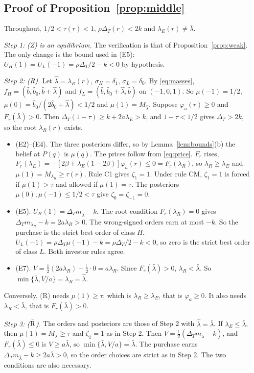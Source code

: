 \documentclass[12pt]{article}
\theoremstyle{definition}
\theoremstyle{remark}
\newcommand{\DT}{\Delta_T}
\newcommand{\lh}{\hat\lambda}
\newcommand{\lb}{\bar\lambda}
\begin{document}
\subsection{Proof of Proposition~\ref{prop:middle}}

Throughout, $1/2<\tau(r)<1$, $\rho\DT(r)<2k$ and $\lambda_E(r)\ne\lb$.

\emph{Step 1: (Z) is an equilibrium.} The verification is that of Proposition~\ref{prop:weak}. The only change is
the bound used in (E5): $U_H(1)=U_L(-1)=\rho\DT/2-k<0$ by hypothesis.

\emph{Step 2: (R).} Let $\lh=\lambda_R(r)$, $\sigma_H=\delta_1$, $\sigma_L=\delta_0$. By \eqref{eq:masses},
$f_H=(\hat b,\hat b_0,\hat b+\lh)$ and $f_L=(\hat b,\hat b_0+\lh,\hat b)$ on $(-1,0,1)$. So
$\mu(-1)=1/2$, $\mu(0)=\hat b_0/(2\hat b_0+\lh)<1/2$ and $\mu(1)=M_{\lh}$. Suppose $\varphi_a(r)\ge0$ and $F_r(\lb)>0$.
Then $\DT(1-\tau)\ge k+2a\lambda_E>k$, and $1-\tau<1/2$ gives $\DT>2k$, so the root $\lambda_R(r)$ exists.
\begin{itemize}[nosep]
\item (E2)--(E4). The three posteriors differ, so by Lemma~\ref{lem:bounds}(b) the belief at $P(q)$ is $\mu(q)$.
  The prices follow from \eqref{eq:price}. $F_r$ rises, $F_r(\lambda_E)=-[2\beta+\lambda_E(1-2\beta)]\varphi_a(r)\le0=F_r(\lambda_R)$, so
  $\lambda_R\ge\lambda_E$ and $\mu(1)=M_{\lambda_R}\ge\tau(r)$. Rule C1 gives $\zeta_1=1$. Under rule CM, $\zeta_1=1$ is
  forced if $\mu(1)>\tau$ and allowed if $\mu(1)=\tau$. The posteriors $\mu(0),\mu(-1)\le1/2<\tau$ give
  $\zeta_0=\zeta_{-1}=0$.
\item (E5). $U_H(1)=\DT m_{\lh}-k$. The root condition $F_r(\lambda_R)=0$ gives $\DT m_{\lambda_R}-k=2a\lambda_R>0$.
  The wrong-signed orders earn at most $-k$. So the purchase is the strict best order of class $H$.
  $U_L(-1)=\rho\DT\mu(-1)-k=\rho\DT/2-k<0$, so zero is the strict best order of class $L$. Both investor rules agree.
\item (E7). $V=\frac12(2a\lambda_R)+\frac12\cdot0=a\lambda_R$. Since $F_r(\lb)>0$, $\lambda_R<\lb$. So
  $\min\{\lb,V/a\}=\lambda_R=\lh$.
\end{itemize}
Conversely, (R) needs $\mu(1)\ge\tau$, which is $\lambda_R\ge\lambda_E$, that is $\varphi_a\ge0$. It also needs
$\lambda_R<\lb$, that is $F_r(\lb)>0$.

\emph{Step 3: ($\bar{\rm R}$).} The orders and posteriors are those of Step 2 with $\lh=\lb$. If $\lambda_E\le\lb$, then
$\mu(1)=M_{\lb}\ge\tau$ and $\zeta_1=1$ as in Step 2. Then $V=\frac12(\DT m_{\lb}-k)$, and $F_r(\lb)\le0$ is
$V\ge a\lb$, so $\min\{\lb,V/a\}=\lb$. The purchase earns $\DT m_{\lb}-k\ge2a\lb>0$, so the order choices are strict as in
Step 2. The two conditions are also necessary.
\end{document}
